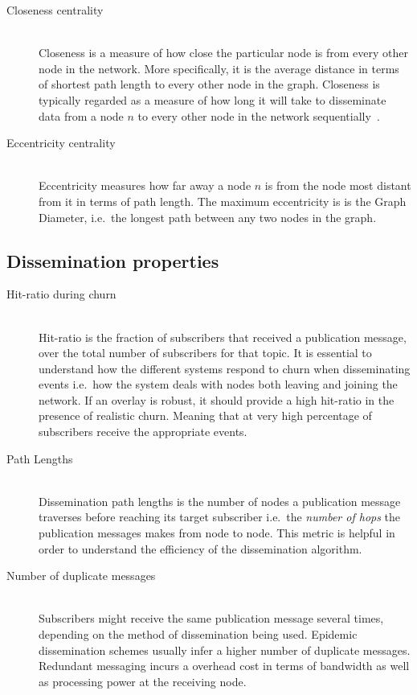 \begin{description}
\item[Closeness centrality]\hfill\\

Closeness is a measure of how close the particular node is from
every other node in the network. More specifically, it is the
average distance in terms of shortest path length to every other
node in the graph. Closeness is typically regarded as a measure of
how long it will take to disseminate data from a node $n$ to every
other node in the network sequentially~\cite{newman2005measure}.

\item[Eccentricity centrality]\hfill\\

Eccentricity measures how far away a node $n$ is from the node most
distant from it in terms of path length. The maximum eccentricity is is
the Graph Diameter, i.e.\ the longest path between any two nodes in the
graph.

\end{description}

\subsection{Dissemination properties}

\begin{description}

\item[Hit-ratio during churn]\hfill\\

Hit-ratio is the fraction of subscribers that received a publication message, over
the total number of subscribers for that topic. It is essential to
understand how the different systems respond to churn when disseminating
events i.e.\ how the system deals with nodes both leaving and joining
the network. If an overlay is robust, it should provide a high hit-ratio in
the presence of realistic churn. Meaning that at very high percentage
of subscribers receive the appropriate events.

\item[Path Lengths]\hfill\\

Dissemination path lengths is the number of nodes a publication message
traverses before reaching its target subscriber i.e.\ the \emph{number
of hops} the publication messages makes from node to node. This
metric is helpful in order to understand the efficiency of the
dissemination algorithm.

\item[Number of duplicate messages]\hfill\\

Subscribers might receive the same publication message several times,
depending on the method of dissemination being used. Epidemic
dissemination schemes usually infer a higher number of duplicate
messages. Redundant messaging incurs a overhead cost in terms of
bandwidth as well as processing power at the receiving node.

\end{description}

